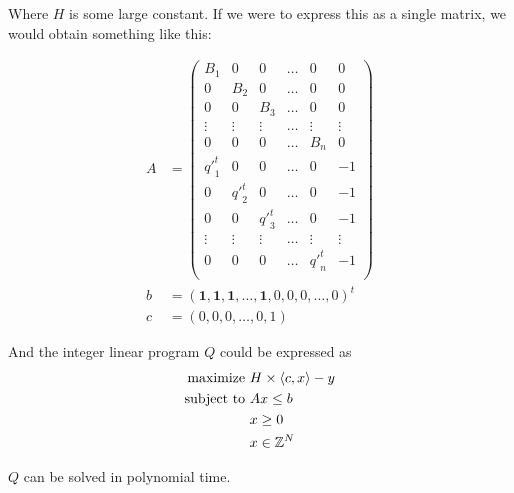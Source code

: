 Where $H$ is some large constant. If we were to express this as a single matrix, we would obtain something like this:

\begin{align*}
A &= \begin{pmatrix}
B_1 & 0   & 0   & \dots & 0 & 0\\
0   & B_2 & 0   & \dots & 0 & 0\\
0   & 0   & B_3 & \dots & 0 & 0\\
\vdots & \vdots & \vdots & \dots & \vdots & \vdots\\
0 & 0 & 0 & \dots & B_n & 0\\
{q'}_1^t & 0 & 0 & \dots & 0 & -1\\
0 & {q'}_2^t & 0 & \dots & 0 & -1\\
0 & 0 & {q'}_3^t & \dots & 0 & -1\\
\vdots & \vdots & \vdots & \dots & \vdots & \vdots\\
0 & 0 & 0 & \dots & {q'}_n^t & -1\\
\end{pmatrix}\\
b &= (\mathbf{1}, \mathbf{1}, \mathbf{1}, \dots, \mathbf{1}, 0, 0, 0, \dots, 0)^t\\
c &= (0, 0, 0, \dots, 0, 1)
\end{align*}

And the integer linear program $Q$ could be expressed as
\begin{alignat}{2}
  \text{maximize } & H \times \langle c, x \rangle - y\\
  \text{subject to } & Ax \le b\\
                     & x \ge 0\\
                     & x \in \mathbb{Z}^N
\end{alignat}

\begin{prop}
$Q$ can be solved in polynomial time.
\end{prop}

